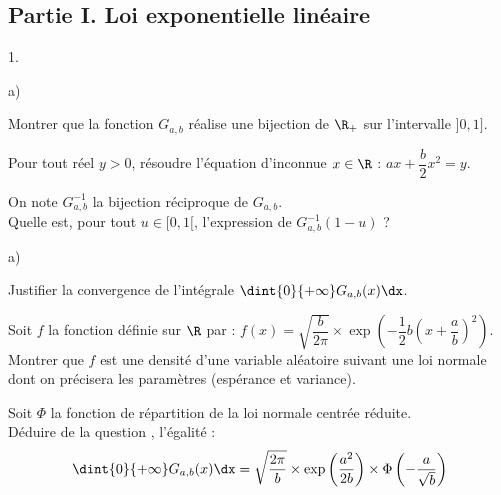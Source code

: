 \documentclass[11pt]{article}%
\begin{document}
\subsection*{Partie I. Loi exponentielle linéaire}

\begin{noliste}{1.}
\item
  \begin{noliste}{a)}
    \setlength{\itemsep}{2mm}
  \item Montrer que la fonction $G_{a,b}$ réalise une bijection de
    $\R_+$ sur l'intervalle $]0,1]$.
    
    
    



  \item Pour tout réel $y>0$, résoudre l'équation d'inconnue $x\in\R$
    : $ax + \dfrac{b}{2} x^2 = y$.

    

  \item On note $G_{a,b}^{-1}$ la bijection réciproque de
    $G_{a,b}$. \\
    Quelle est, pour tout $u\in[0,1[$, l'expression de
    $G_{a,b}^{-1}(1-u)$ ?

    
  \end{noliste}




\item
  \begin{noliste}{a)}
    \setlength{\itemsep}{2mm}
  \item Justifier la convergence de l'intégrale $\dint{0}{+\infty}
    G_{a,b}(x)\dx$.

    

  \item Soit $f$ la fonction définie sur $\R$ par : $f(x) =
    \sqrt{\dfrac{b}{2\pi}}\times \exp \left(-\dfrac{1}{2} b
      \left(x+\dfrac{a}{b}\right)^2 \right)$.\\
    Montrer que $f$ est une densité d'une variable aléatoire suivant
    une loi normale dont on précisera les paramètres (espérance et
    variance).

    




  \item Soit $\Phi$ la fonction de répartition de la loi normale
    centrée réduite. \\
    Déduire de la question , l'égalité :
    \[
    \dint{0}{+\infty} G_{a,b}(x)\dx = \sqrt{\frac{2\pi}{b}}\times
    \exp\left(\frac{a^2}{2b}\right) \times
    \Phi\left(-\frac{a}{\sqrt{b}}\right)
    \]


\end{noliste}
\end{noliste}
\end{document}
